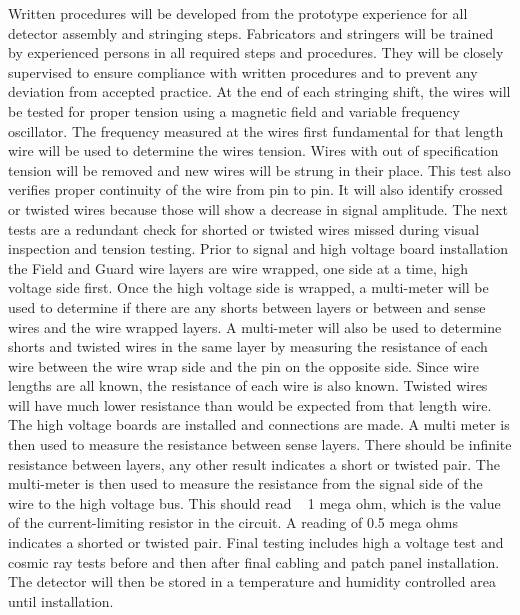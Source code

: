 	Written procedures will be developed from the prototype experience for all detector 
assembly and stringing steps. Fabricators and stringers will be trained by experienced persons 
in all required steps and procedures. They will be closely supervised to ensure compliance with 
written procedures and to prevent any deviation from accepted practice. 
	At the end of each stringing shift, the wires will be tested for proper tension using a 
magnetic field and variable frequency oscillator. The frequency measured at the wires first 
fundamental for that length wire will be used to determine the wires tension. Wires with out of 
specification tension will be removed and new wires will be strung in their place. This test 
also verifies proper continuity of the wire from pin to pin. It will also identify crossed or 
twisted wires because those will show a decrease in signal amplitude.
	The next tests are a redundant check for shorted or twisted wires missed during visual 
inspection and tension testing. Prior to signal and high voltage board installation the Field 
and Guard wire layers are wire wrapped, one side at a time, high voltage side first. Once the 
high voltage side is wrapped, a multi-meter will be used to determine if there are any shorts 
between layers or between and sense wires and the wire wrapped layers. A multi-meter will also 
be used to determine shorts and twisted wires in the same layer by measuring the resistance of 
each wire between the wire wrap side and the pin on the opposite side. Since wire lengths are 
all known, the resistance of each wire is also known. Twisted wires will have much lower 
resistance than would be expected from that length wire. The high voltage boards are installed 
and connections are made. A multi meter is then used to measure the resistance between sense 
layers. There should be infinite resistance between layers, any other result indicates a short 
or twisted pair. The multi-meter is then used to measure the resistance from the signal side of 
the wire to the high voltage bus. This should read ~ 1 mega ohm, which is the value of the 
current-limiting resistor in the circuit. A reading of 0.5 mega ohms indicates a shorted or 
twisted pair.
	Final testing includes high a voltage test and cosmic ray tests before and then after 
final cabling and patch panel installation. The detector will then be stored in a temperature 
and humidity controlled area until installation. 
	 


